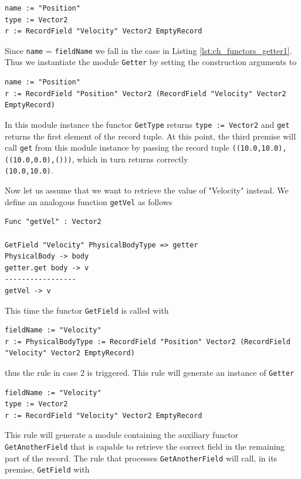 \begin{lstlisting}
name := "Position"
type := Vector2
r := RecordField "Velocity" Vector2 EmptyRecord
\end{lstlisting}
 
\noindent
Since \texttt{name} = \texttt{fieldName} we fall in the case in Listing \ref{lst:ch_functors_getter1}. Thus we instantiate the module \texttt{Getter} by setting the construction arguments to 

\begin{lstlisting}
name := "Position"
r := RecordField "Position" Vector2 (RecordField "Velocity" Vector2 EmptyRecord)
\end{lstlisting}

\noindent
In this module instance the functor \texttt{GetType} returns \texttt{type :=  Vector2} and \texttt{get} returns the first element of the record tuple. At this point, the third premise will call \texttt{get} from this module instance by passing the record tuple \texttt{((10.0,10.0),((10.0,0.0),()))}, which in turn returns correctly\\ \texttt{(10.0,10.0)}.

Now let us assume that we want to retrieve the value of "Velocity" instead. We define an analogous function \texttt{getVel} as follows

\begin{lstlisting}
Func "getVel" : Vector2

GetField "Velocity" PhysicalBodyType => getter
PhysicalBody -> body
getter.get body -> v
-----------------
getVel -> v
\end{lstlisting}

\noindent
This time the functor \texttt{GetField} is called with

\begin{lstlisting}
fieldName := "Velocity"
r := PhysicalBodyType := RecordField "Position" Vector2 (RecordField "Velocity" Vector2 EmptyRecord)
\end{lstlisting}

\noindent
thus the rule in case 2 is triggered. This rule will generate an instance of \texttt{Getter}

\begin{lstlisting}
fieldName := "Velocity"
type := Vector2
r := RecordField "Velocity" Vector2 EmptyRecord
\end{lstlisting}

\noindent
This rule will generate a module containing the auxiliary functor\\ \texttt{GetAnotherField} that is capable to retrieve the correct field in the remaining part of the record. The rule that processes \texttt{GetAnotherField} will call, in its premise, \texttt{GetField} with

